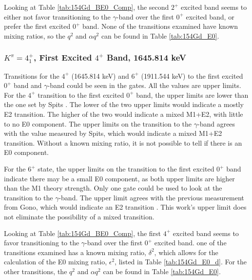 Looking at Table \ref{tab:154Gd_BE0_Comp}, the second $2^+$ excited band seems to either not favor transitioning to the $\gamma$-band over the first $0^+$ excited band, or prefer the first excited $0^+$ band. None of the transitions examined have known mixing ratios, so the $q^2$ and $\alpha q^2$ can be found in Table \ref{tab:154Gd_E0}. 

\subsubsection{$K^{\pi}=4^+_1$, First Excited $4^+$ Band, 1645.814 keV}

Transitions for the $4^+$ (1645.814 keV) and $6^+$ (1911.544 keV) to the first excited $0^+$ band and $\gamma$-band could be seen in the gates. All the values are upper limits. For the $4^+$ transition to the first excited $0^+$ band, the upper limits are lower than the one set by Spits \citep{spits96:_154gd}. The lower of the two upper limits would indicate a mostly E2 transition. The higher of the two would indicate a mixed M1+E2, with little to no E0 component. The upper limits on the transition to the $\gamma$-band agrees with the value measured by Spits, which would indicate a mixed M1+E2 transition. Without a known mixing ratio, it is not possible to tell if there is an E0 component.

For the $6^+$ state, the upper limits on the transition to the first excited $0^+$ band indicate there may be a small E0 component, as both upper limits are higher than the M1 theory strength. Only one gate could be used to look at the transition to the $\gamma$-band. The upper limit agrees with the previous measurement from Gono, which would indicate an E2 transition \citep{gono74:_154gd_e0}. This work's upper limit does not eliminate the possibility of a mixed transition.

Looking at Table \ref{tab:154Gd_BE0_Comp}, the first $4^+$ excited band seems to favor transitioning to the $\gamma$-band over the first $0^+$ excited band. one of the transitions examined has a known mixing ratio, $\delta^2$, which allows for the calculation of the E0 mixing ratio, $\epsilon^2$, listed in Table \ref{tab:154Gd_E0_d}. For the other transitions, the $q^2$ and $\alpha q^2$ can be found in Table \ref{tab:154Gd_E0}. 